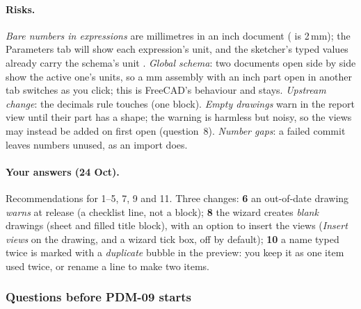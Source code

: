 \paragraph{Risks.} \emph{Bare numbers in expressions} are millimetres in an inch document ( is 2\,mm); the
Parameters tab will show each expression's unit, and the sketcher's typed values already carry the schema's unit
\verify. \emph{Global schema}: two documents open side by side show the active one's units, so a mm assembly with an
inch part open in another tab switches as you click; this is FreeCAD's behaviour and stays. \emph{Upstream change}:
the decimals rule touches  (one \code{[BW]} block). \emph{Empty drawings} warn in the report
view until their part has a shape; the warning is harmless but noisy, so the views may instead be added on first
open (question~8). \emph{Number gaps}: a failed commit leaves numbers unused, as an import does.

\paragraph{Your answers (24 Oct).} Recommendations for 1--5, 7, 9 and 11. Three changes:
\textbf{6} an out-of-date drawing \emph{warns} at release (a checklist line, not a block);
\textbf{8} the wizard creates \emph{blank} drawings (sheet and filled title block), with an option to insert the views
(\emph{Insert views} on the drawing, and a wizard tick box, off by default);
\textbf{10} a name typed twice is marked with a \emph{duplicate} bubble in the preview: you keep it as one item used
twice, or rename a line to make two items.

\subsubsection*{Questions before PDM-09 starts}


